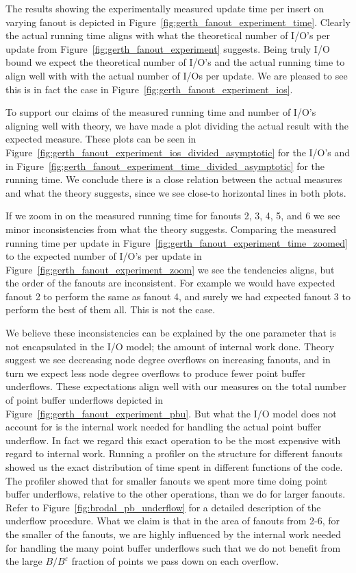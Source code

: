 \documentclass[twoside,11pt,openright]{report}
\def \epsilon {\varepsilon}
\begin{document}
The results showing the experimentally measured update time per insert on varying fanout is depicted in Figure~\ref{fig:gerth_fanout_experiment_time}. Clearly the actual running time aligns with what the theoretical number of I/O's per update from Figure~\ref{fig:gerth_fanout_experiment} suggests. Being truly I/O bound we expect the theoretical number of I/O's and the actual running time to align well with with the actual number of I/Os per update. We are pleased to see this is in fact the case in Figure~\ref{fig:gerth_fanout_experiment_ios}.

To support our claims of the measured running time and number of I/O's aligning well with theory, we have made a plot dividing the actual result with the expected measure. These plots can be seen in Figure~\ref{fig:gerth_fanout_experiment_ios_divided_asymptotic} for the I/O's and in Figure~\ref{fig:gerth_fanout_experiment_time_divided_asymptotic} for the running time. We conclude there is a close relation between the actual measures and what the theory suggests, since we see close-to horizontal lines in both plots.

If we zoom in on the measured running time for fanouts 2, 3, 4, 5, and 6 we see minor inconsistencies from what the theory suggests. Comparing the measured running time per update in Figure~\ref{fig:gerth_fanout_experiment_time_zoomed} to the expected number of I/O's per update in Figure~\ref{fig:gerth_fanout_experiment_zoom} we see the tendencies aligns, but the order of the fanouts are inconsistent. For example we would have expected fanout 2 to perform the same as fanout 4, and surely we had expected fanout 3 to perform the best of them all. This is not the case.

We believe these inconsistencies can be explained by the one parameter that is not encapsulated in the I/O model; the amount of internal work done. Theory suggest we see decreasing node degree overflows on increasing fanouts, and in turn we expect less node degree overflows to produce fewer point buffer underflows. These expectations align well with our measures on the total number of point buffer underflows depicted in Figure~\ref{fig:gerth_fanout_experiment_pbu}. But what the I/O model does not account for is the internal work needed for handling the actual point buffer underflow. In fact we regard this exact operation to be the most expensive with regard to internal work. 
Running a profiler on the structure for different fanouts showed us the exact distribution of time spent in different functions of the code. The profiler showed that for smaller fanouts we spent more time doing point buffer underflows, relative to the other operations, than we do for larger fanouts. Refer to Figure~\ref{fig:brodal_pb_underflow} for a detailed description of the underflow procedure. What we claim is that in the area of fanouts from 2-6, for the smaller of the fanouts, we are highly influenced by the internal work needed for handling the many point buffer underflows such that we do not benefit from the large $B / B^\epsilon$ fraction of points we pass down on each overflow.
\end{document}
